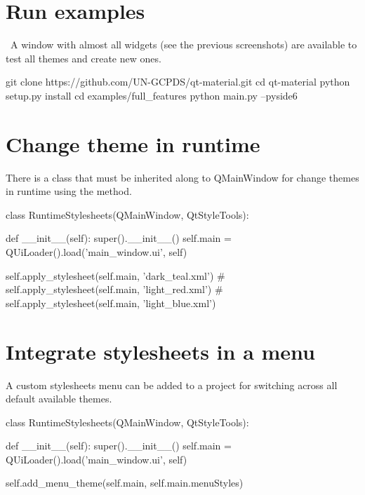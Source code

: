 

\section{Run examples}\
A window with almost all widgets (see the previous screenshots) are available to test all themes and create new ones.
\begin{python}
git clone https://github.com/UN-GCPDS/qt-material.git
cd qt-material
python setup.py install
cd examples/full_features
python main.py --pyside6
\end{python}

\section{Change theme in runtime}
There is a  class that must be inherited along to QMainWindow for change themes in runtime using the  method.
\begin{python}
class RuntimeStylesheets(QMainWindow, QtStyleTools):
    
    def __init__(self):
        super().__init__()
        self.main = QUiLoader().load('main_window.ui', self)
        
        self.apply_stylesheet(self.main, 'dark_teal.xml')
        # self.apply_stylesheet(self.main, 'light_red.xml')
        # self.apply_stylesheet(self.main, 'light_blue.xml')
\end{python}

\section{Integrate stylesheets in a menu}
A custom stylesheets menu can be added to a project for switching across all default available themes.
\begin{python}
class RuntimeStylesheets(QMainWindow, QtStyleTools):
    
    def __init__(self):
        super().__init__()
        self.main = QUiLoader().load('main_window.ui', self)
        
        self.add_menu_theme(self.main, self.main.menuStyles)
\end{python}


